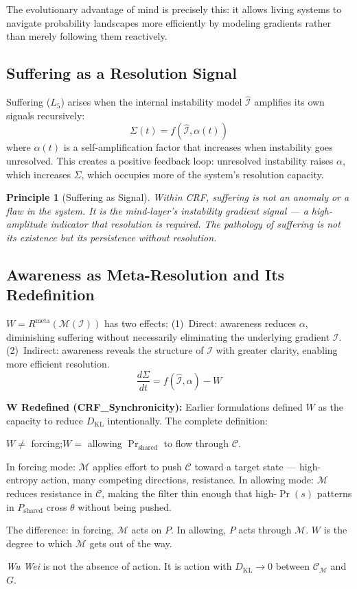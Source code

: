 \documentclass[12pt, a4paper]{article}
\newtheorem{principle}{Principle}[section]
\begin{document}
The evolutionary advantage of mind is precisely this: it allows living systems to navigate
probability landscapes more efficiently by modeling gradients rather than merely following
them reactively.

\subsection{Suffering as a Resolution Signal}

Suffering ($L_5$) arises when the internal instability model $\hat{\mathcal{I}}$ amplifies
its own signals recursively:
\[ \Sigma(t) = f(\hat{\mathcal{I}}, \alpha(t)) \]
where $\alpha(t)$ is a self-amplification factor that increases when instability goes
unresolved. This creates a positive feedback loop: unresolved instability raises $\alpha$,
which increases $\Sigma$, which occupies more of the system's resolution capacity.

\begin{principle}[Suffering as Signal]
Within CRF, suffering is not an anomaly or a flaw in the system. It is the mind-layer's
instability gradient signal --- a high-amplitude indicator that resolution is required.
The pathology of suffering is not its existence but its persistence without resolution.
\end{principle}

\subsection{Awareness as Meta-Resolution and Its Redefinition}

$W = R^{\mathrm{meta}}(\mathcal{M}(\mathcal{I}))$ has two effects:
(1)~Direct: awareness reduces $\alpha$, diminishing suffering without necessarily
eliminating the underlying gradient $\mathcal{I}$.
(2)~Indirect: awareness reveals the structure of $\mathcal{I}$ with greater clarity,
enabling more efficient resolution.
\[ \frac{d\Sigma}{dt} = f(\hat{\mathcal{I}}, \alpha) - W \]

\textbf{W Redefined (CRF\_Synchronicity):} Earlier formulations defined $W$ as the capacity
to reduce $D_{\mathrm{KL}}$ intentionally. The complete definition:

\begin{derivedbox}[title={$W$ --- Complete Definition}]
$W \neq$ forcing;\qquad $W =$ allowing $\Pr_{\mathrm{shared}}$ to flow through $\mathcal{C}$.

In forcing mode: $\mathcal{M}$ applies effort to push $\mathcal{C}$ toward a target state
--- high-entropy action, many competing directions, resistance. In allowing mode: $\mathcal{M}$
reduces resistance in $\mathcal{C}$, making the filter thin enough that high-$\Pr(s)$
patterns in $P_{\mathrm{shared}}$ cross $\theta$ without being pushed.

The difference: in forcing, $\mathcal{M}$ acts on $P$. In allowing, $P$ acts through $\mathcal{M}$.
$W$ is the degree to which $\mathcal{M}$ gets out of the way.

\textit{Wu Wei} is not the absence of action. It is action with $D_{\mathrm{KL}} \to 0$
between $\mathcal{C}_\mathcal{M}$ and $G$.
\end{derivedbox}
\end{document}

